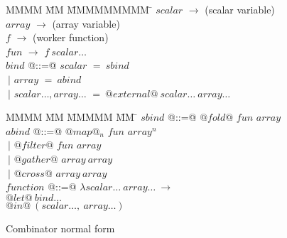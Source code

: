 \begin{figure}
\begin{tabbing}
MMMM        \= MM \= MMMMMMMMM \= \kill
$scalar$    \> $\to$ \> (scalar variable) \\
$array$     \> $\to$ \> (array variable)  \\
$f$         \> $\to$ \> (worker function) \\
$fun$       \> $\to$ \> $f~scalar\ldots$
\\[2ex]
$bind$      \> @::=@ \> $scalar$ \> $=~sbind$ \\
            \> $~|$  \> $array$  \> $=~abind$ \\
            \> $~|$  \> $scalar\ldots,array\ldots$ \> $=~@external@~scalar\ldots~array\ldots$
\end{tabbing}

\begin{tabbing}
MMMM        \= MM \= MMMMM \= MM \= \kill
$sbind$     \> @::=@ \> $@fold@$   \> $fun$ \> $array$
\\[1ex]

$abind$     \> @::=@ \> $@map@_n$  \> $fun$ \> $array^n$ \\
            \> $~|$  \> $@filter@$ \> $fun$ \> $array$ \\
            \> $~|$  \> $@gather@$ \>       \> $array~array$ \\
            \> $~|$  \> $@cross@$  \>       \> $array~array$
\\[1ex]
$function$  \> @::=@ \> $\lambda scalar\ldots~array\ldots~\to$ \\
            \>          \> $@let@~bind\ldots$                  \\
            \>          \> $@in@~(scalar\ldots,~array\ldots)$
\end{tabbing}
\caption{Combinator normal form}
\label{f:CombinatorNormalForm}
\end{figure}

